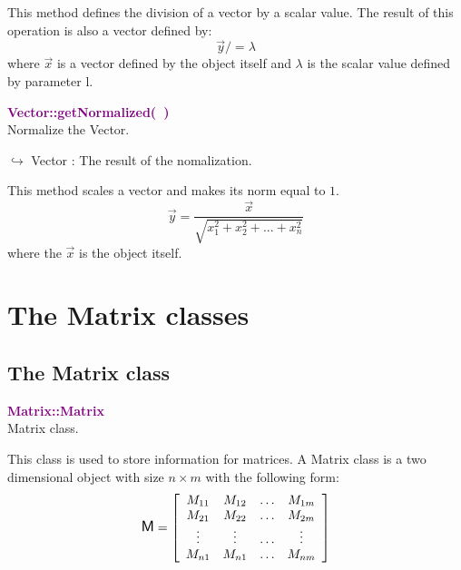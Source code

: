 This method defines the division of a vector by a scalar value.
The result of this operation is also a vector defined by:
\begin{equation*}
\overrightarrow{y} /= \lambda
\end{equation*}
where $\overrightarrow{x}$ is a vector defined by the object itself and $\lambda$ is the scalar value defined by parameter l.

\textcolor{purple}{\textbf{Vector::getNormalized(~)}}\label{Vector::getNormalized()}\\
Normalize the Vector.\vspace*{-0.5em}
\begin{tcolorbox}[grow to left by=-1cm, width=\textwidth-1cm,myArgs,tabularx={l|R}]
$\hookrightarrow$  Vector : The result of the nomalization.
\end{tcolorbox}

This method scales a vector and makes its norm equal to $1$.
\begin{equation*}
\overrightarrow{y} = \frac{\overrightarrow{x}}{\sqrt {x_{1}^2 + x_{2}^2 + ... + x_{n}^2}}
\end{equation*}
where the $\overrightarrow{x}$ is the object itself.


\section{The Matrix classes}

\subsection{The Matrix class}

\textcolor{purple}{\textbf{Matrix::Matrix}}\label{Matrix::Matrix}\\
Matrix class.

This class is used to store information for matrices.
A Matrix class is a two dimensional object with size $n\times m$ with the following form:
\begin{equation*}
\mbox{\large\ensuremath{\mathsf{M}}}=\left[\begin{array}{cccc}
  M_{11} & M_{12} & \hdots & M_{1m}\\
  M_{21} & M_{22} & \hdots & M_{2m}\\
  \vdots & \vdots & \hdots & \vdots\\
  M_{n1} & M_{n1} & \hdots & M_{nm}
  \end{array}\right]
\end{equation*}

